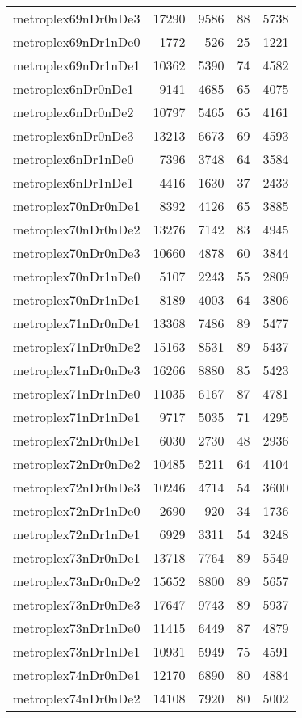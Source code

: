 \begin{longtable}{lrrrr}
metroplex69nDr0nDe3 & 17290 & 9586 & 88 & 5738 \\
metroplex69nDr1nDe0 & 1772 & 526 & 25 & 1221 \\
metroplex69nDr1nDe1 & 10362 & 5390 & 74 & 4582 \\
metroplex6nDr0nDe1 & 9141 & 4685 & 65 & 4075 \\
metroplex6nDr0nDe2 & 10797 & 5465 & 65 & 4161 \\
metroplex6nDr0nDe3 & 13213 & 6673 & 69 & 4593 \\
metroplex6nDr1nDe0 & 7396 & 3748 & 64 & 3584 \\
metroplex6nDr1nDe1 & 4416 & 1630 & 37 & 2433 \\
metroplex70nDr0nDe1 & 8392 & 4126 & 65 & 3885 \\
metroplex70nDr0nDe2 & 13276 & 7142 & 83 & 4945 \\
metroplex70nDr0nDe3 & 10660 & 4878 & 60 & 3844 \\
metroplex70nDr1nDe0 & 5107 & 2243 & 55 & 2809 \\
metroplex70nDr1nDe1 & 8189 & 4003 & 64 & 3806 \\
metroplex71nDr0nDe1 & 13368 & 7486 & 89 & 5477 \\
metroplex71nDr0nDe2 & 15163 & 8531 & 89 & 5437 \\
metroplex71nDr0nDe3 & 16266 & 8880 & 85 & 5423 \\
metroplex71nDr1nDe0 & 11035 & 6167 & 87 & 4781 \\
metroplex71nDr1nDe1 & 9717 & 5035 & 71 & 4295 \\
metroplex72nDr0nDe1 & 6030 & 2730 & 48 & 2936 \\
metroplex72nDr0nDe2 & 10485 & 5211 & 64 & 4104 \\
metroplex72nDr0nDe3 & 10246 & 4714 & 54 & 3600 \\
metroplex72nDr1nDe0 & 2690 & 920 & 34 & 1736 \\
metroplex72nDr1nDe1 & 6929 & 3311 & 54 & 3248 \\
metroplex73nDr0nDe1 & 13718 & 7764 & 89 & 5549 \\
metroplex73nDr0nDe2 & 15652 & 8800 & 89 & 5657 \\
metroplex73nDr0nDe3 & 17647 & 9743 & 89 & 5937 \\
metroplex73nDr1nDe0 & 11415 & 6449 & 87 & 4879 \\
metroplex73nDr1nDe1 & 10931 & 5949 & 75 & 4591 \\
metroplex74nDr0nDe1 & 12170 & 6890 & 80 & 4884 \\
metroplex74nDr0nDe2 & 14108 & 7920 & 80 & 5002 \\

\end{longtable}
